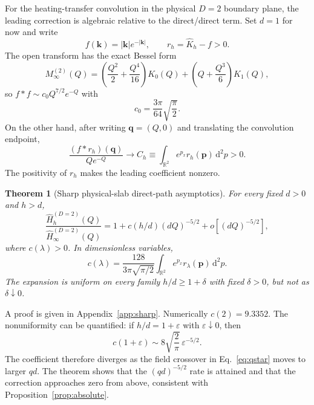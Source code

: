 \documentclass[aps,pra,twocolumn,superscriptaddress,longbibliography,nofootinbib,floatfix]{revtex4-2}
\newtheorem{theorem}{Theorem}
\theoremstyle{remark}
\newcommand{\dd}{\mathrm d}
\newcommand{\R}{\mathbb R}
\newcommand{\kvec}{\bm k}
\newcommand{\qvec}{\bm q}
\newcommand{\Khat}{\widehat K}
\newcommand{\Hhat}{\widehat H}
\begin{document}
For the heating-transfer convolution in the physical $D=2$ boundary plane, the leading correction is algebraic relative to the direct/direct term.  Set $d=1$ for now and write
\begin{equation}
f(\kvec)=|\kvec|e^{-|\kvec|},\qquad r_h=\Khat_h-f>0.
\end{equation}
The open transform has the exact Bessel form
\begin{equation}
M_\infty^{(2)}(Q)=\left(\frac{Q^2}{2}+\frac{Q^4}{16}\right)K_0(Q)
+\left(Q+\frac{Q^3}{6}\right)K_1(Q),
\label{eq:Mopen}
\end{equation}
so $f*f\sim c_0Q^{7/2}e^{-Q}$ with
\begin{equation}
c_0=\frac{3\pi}{64}\sqrt{\frac{\pi}{2}}.
\end{equation}
On the other hand, after writing $\qvec=(Q,0)$ and translating the convolution endpoint,
\begin{equation}
\frac{(f*r_h)(\qvec)}{Qe^{-Q}}
\longrightarrow C_h\equiv\int_{\R^2}e^{p_x}r_h(\bm p)\,\dd^2p>0.
\label{eq:crosslimit}
\end{equation}
The positivity of $r_h$ makes the leading coefficient nonzero.

\begin{theorem}[Sharp physical-slab direct-path asymptotics]
\label{thm:sharp}
For every fixed $d>0$ and $h>d$,
\begin{equation}
\boxed{\displaystyle
\frac{\Hhat_h^{(D=2)}(Q)}{\Hhat_\infty^{(D=2)}(Q)}
=1+c(h/d)(dQ)^{-5/2}+o[(dQ)^{-5/2}],}
\label{eq:sharpasym}
\end{equation}
where $c(\lambda)>0$.  In dimensionless variables,
\begin{equation}
c(\lambda)=\frac{128}{3\pi\sqrt{\pi/2}}
\int_{\R^2}e^{p_x}r_\lambda(\bm p)\,\dd^2p.
\label{eq:ccoef}
\end{equation}
The expansion is uniform on every family $h/d\ge1+\delta$ with fixed $\delta>0$, but not as $\delta\downarrow0$.
\end{theorem}

A proof is given in Appendix~\ref{app:sharp}.  Numerically $c(2)=9.3352$.  The nonuniformity can be quantified: if $h/d=1+\varepsilon$ with $\varepsilon\downarrow0$, then
\begin{equation}
c(1+\varepsilon)\sim 8\sqrt{\frac{2}{\pi}}\,\varepsilon^{-5/2}.
\label{eq:cclose}
\end{equation}
The coefficient therefore diverges as the field crossover in Eq.~\eqref{eq:qstar} moves to larger $qd$.  The theorem shows that the $(qd)^{-5/2}$ rate is attained and that the correction approaches zero from above, consistent with Proposition~\ref{prop:absolute}.
\end{document}
